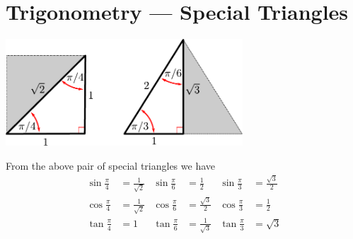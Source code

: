 \section{Trigonometry --- Special Triangles}
\begin{center}
  \includegraphics[height=4cm]{special_triangles}
\end{center}
From the above pair of special triangles we have
\begin{align*}
  \sin \frac{\pi}{4} &= \frac{1}{\sqrt{2}} &  \sin \frac{\pi}{6} &= \frac{1}{2} & \sin \frac{\pi}{3} &= \frac{\sqrt{3}}{2} \\   
  \cos \frac{\pi}{4} &= \frac{1}{\sqrt{2}} &  \cos \frac{\pi}{6} &= \frac{\sqrt{3}}{2} & \cos \frac{\pi}{3} &= \frac{1}{2} \\   
  \tan \frac{\pi}{4} &= 1 &  \tan \frac{\pi}{6} &= \frac{1}{\sqrt{3}} & \tan 
\frac{\pi}{3} &= \sqrt{3}
\end{align*}

